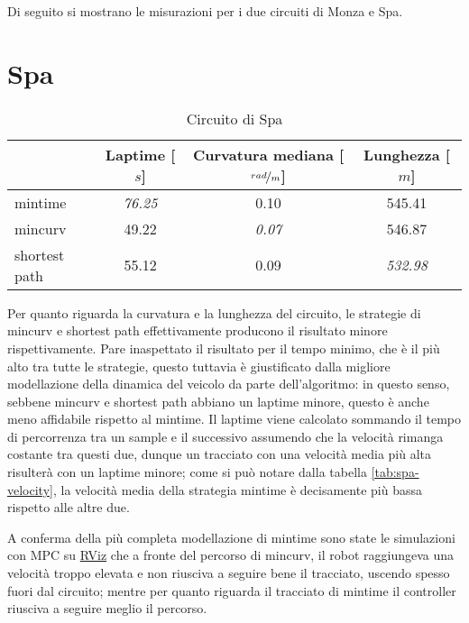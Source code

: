 Di seguito si mostrano le misurazioni per i due circuiti di Monza e Spa.

\section{Spa}

\begin{table}[H]
	\caption{Circuito di Spa}
	\label{tab:opt-spa}
	\begin{center}
		\begin{tabular} {l|c|c|c}
			                & Laptime [$s$]  & Curvatura mediana [$\nicefrac{rad}{m}$] & Lunghezza [$m$]\\
			\hline
			mintime         & \textit{76.25} & 0.10           & 545.41          \\
			mincurv         & 49.22          & \textit{0.07 } & 546.87          \\
			shortest path   & 55.12          & 0.09           & \textit{532.98} \\
			\hline
		\end{tabular}
	\end{center}
\end{table}
Per quanto riguarda la curvatura e la lunghezza del circuito, le strategie di mincurv e shortest path
effettivamente producono il risultato minore rispettivamente. Pare inaspettato il risultato per il tempo
minimo, che è il più alto tra tutte le strategie, questo tuttavia è giustificato dalla migliore
modellazione della dinamica del veicolo da parte dell'algoritmo: in questo senso, sebbene mincurv e
shortest path abbiano un laptime minore, questo è anche meno affidabile rispetto al mintime. Il laptime
viene calcolato sommando il tempo di percorrenza tra un sample e il successivo assumendo che la velocità
rimanga costante tra questi due, dunque un tracciato con una velocità media più alta risulterà con un
laptime minore; come si può notare dalla tabella \ref{tab:spa-velocity}, la velocità media della
strategia mintime è decisamente più bassa rispetto alle altre due.

A conferma della più completa modellazione di mintime sono state le simulazioni con MPC su
\hyperref[sec:rviz]{RViz} che a fronte del percorso di mincurv, il robot raggiungeva una velocità troppo
elevata e non riusciva a seguire bene il tracciato, uscendo spesso fuori dal circuito; mentre per quanto
riguarda il tracciato di mintime il controller riusciva a seguire meglio il percorso.

